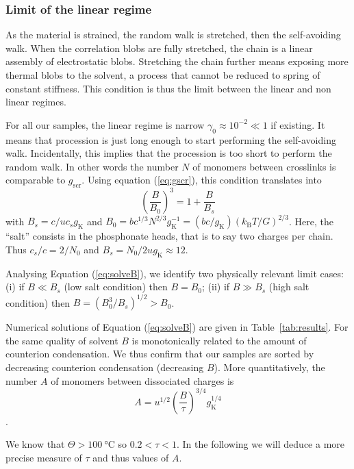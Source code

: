 \documentclass[journal=jacsat,manuscript=article]{achemso}
\begin{document}
\subsubsection{Limit of the linear regime}

As the material is strained, the random walk is stretched, then the self-avoiding walk. When the correlation blobs are fully stretched, the chain is a linear assembly of electrostatic blobs. Stretching the chain further means exposing more thermal blobs to the solvent, a process that cannot be reduced to spring of constant stiffness. This condition is thus the limit between the linear and non linear regimes.

For all our samples, the linear regime is narrow $\gamma_0\approx 10^{-2}\ll 1$ if existing. It means that procession is just long enough to start performing the self-avoiding walk. Incidentally, this implies that the procession is too short to perform the random walk. In other words the number $N$ of monomers between crosslinks is comparable to $g_\mathrm{scr}$. Using equation (\ref{eq:gscr}), this condition translates into
\begin{equation}
\left(\frac{B}{B_0}\right)^3 = 1 + \frac{B}{B_s}
\label{eq:solveB}
\end{equation}
with $B_s = c/u c_s g_\mathrm{K}$ and $B_0 = b c^{1/3} N^{2/3} g_\mathrm{K}^{-1} = (bc/g_\mathrm{K}) \left(k_\mathrm{B}T/G\right)^{2/3}$. Here, the ``salt'' consists in the phosphonate heads, that is to say two charges per chain. Thus $c_s/c = 2/N_0$ and $B_s = N_0/2u g_\mathrm{K} \approx 12$.

Analysing Equation (\ref{eq:solveB}), we identify two physically relevant limit cases: (i) if $B \ll B_s$ (low salt condition) then $B = B_0$; (ii) if $B \gg B_s$ (high salt condition) then $B = \left(B_0^3/B_s\right)^{1/2} > B_0$.

Numerical solutions of Equation (\ref{eq:solveB}) are given in Table~\ref{tab:results}. For the same quality of solvent $B$ is monotonically related to the amount of counterion condensation. We thus confirm that our samples are sorted by decreasing counterion condensation (decreasing $B$). More quantitatively, the number $A$ of monomers between dissociated charges is
\begin{equation}
A = u^{1/2} \left(\frac{B}{\tau}\right)^{3/4} g_\mathrm{K}^{1/4}
\label{eq:A}
\end{equation}.

We know that $\Theta>\SI{100}{\celsius}$ so $0.2<\tau<1$. In the following we will deduce a more precise measure of $\tau$ and thus values of $A$.
\end{document}
